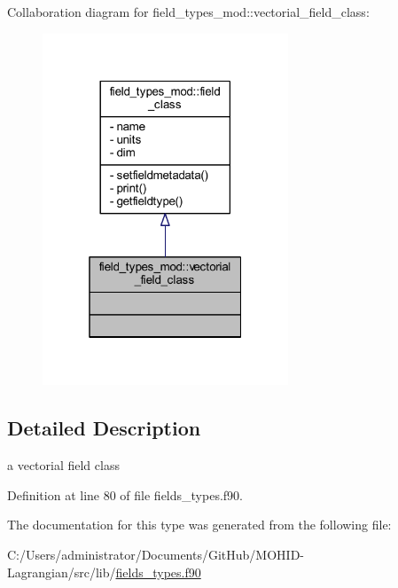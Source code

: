 Collaboration diagram for field\+\_\+types\+\_\+mod\+:\+:vectorial\+\_\+field\+\_\+class\+:
\nopagebreak
\begin{figure}[H]
\begin{center}
\leavevmode
\includegraphics[width=208pt]{structfield__types__mod_1_1vectorial__field__class__coll__graph}
\end{center}
\end{figure}


\subsection{Detailed Description}
a vectorial field class 

Definition at line 80 of file fields\+\_\+types.\+f90.



The documentation for this type was generated from the following file\+:\begin{DoxyCompactItemize}
\item 
C\+:/\+Users/administrator/\+Documents/\+Git\+Hub/\+M\+O\+H\+I\+D-\/\+Lagrangian/src/lib/\mbox{\hyperlink{fields__types_8f90}{fields\+\_\+types.\+f90}}\end{DoxyCompactItemize}
